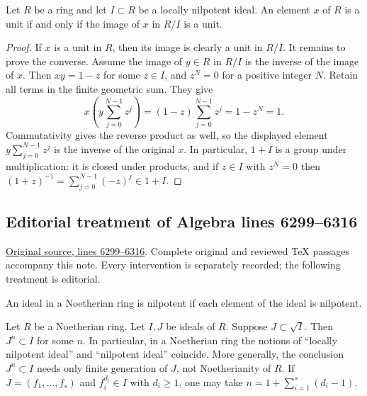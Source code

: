 \begin{lemma}
\label{editorial-source-lemma-locally-nilpotent-unit}
Let $R$ be a ring and let $I \subset R$ be a locally nilpotent
ideal.
An element $x$ of $R$ is a unit if and only if the image of $x$
in $R/I$ is a unit.
\end{lemma}

\begin{proof}
If $x$ is a unit in $R$, then its image is clearly a unit in $R/I$.
It remains to prove the converse.
Assume the image of $y \in R$ in $R/I$ is the inverse of the image of $x$.
Then $xy=1-z$ for some $z\in I$, and $z^N=0$ for a positive
integer $N$. Retain all terms in the finite geometric sum. They give
$$
x\left(y\sum_{j=0}^{N-1}z^j\right)
=(1-z)\sum_{j=0}^{N-1}z^j=1-z^N=1.
$$
Commutativity gives the reverse product as well, so the displayed
element $y\sum_{j=0}^{N-1}z^j$ is the inverse of the original $x$.
In particular, $1+I$ is a group under multiplication: it is closed
under products, and if $z\in I$ with $z^N=0$ then
$(1+z)^{-1}=\sum_{j=0}^{N-1}(-z)^j\in1+I$.
\end{proof}


\subsection{Editorial treatment of Algebra lines 6299--6316}

\hypertarget{algebra-context-048}{}

\noindent\href{https://github.com/stacks/stacks-project/blob/a04446e57ec1fbc252a871afcec7752fb2807b14/algebra.tex\#L6299}{Original source, lines 6299--6316}. Complete original and reviewed TeX passages accompany this note. Every intervention is separately recorded; the following treatment is editorial.


\begin{lemma}
\label{editorial-source-lemma-Noetherian-power}
\begin{slogan}
An ideal in a Noetherian ring is nilpotent if each element
of the ideal is nilpotent.
\end{slogan}
Let $R$ be a Noetherian ring. Let $I, J$ be ideals of $R$.
Suppose $J \subset \sqrt{I}$. Then $J^n \subset I$ for some $n$.
In particular, in a Noetherian ring the notions of
``locally nilpotent ideal''
and ``nilpotent ideal'' coincide.
More generally, the conclusion $J^n\subset I$ needs only finite
generation of $J$, not Noetherianity of $R$. If
$J=(f_1,\ldots,f_s)$ and $f_i^{d_i}\in I$ with $d_i\geq1$, one may
take $n=1+\sum_{i=1}^s(d_i-1)$.
\end{lemma}

